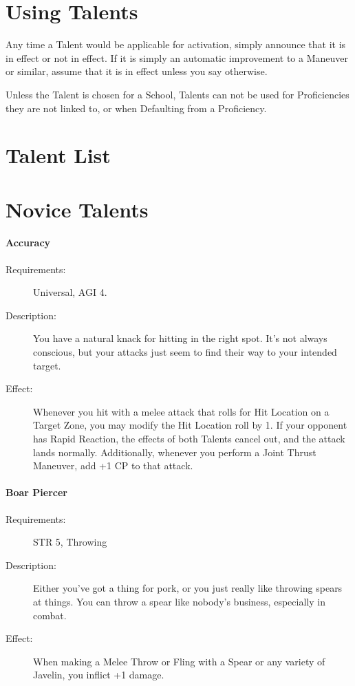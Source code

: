 \documentclass[oneside,11pt,english]{book}
\begin{document}
\section{Using Talents}
Any time a Talent would be applicable for activation, simply announce that it is in effect or not in effect.
If it is simply an automatic improvement to a Maneuver or similar, assume that it is in effect unless you say otherwise. 

Unless the Talent is chosen for a School, Talents can not be used for Proficiencies they are not linked to, or when Defaulting from a Proficiency. 

\section*{Talent List}
\section{Novice Talents}\label{sec:Novice Talents}
\paragraph{\label{talent:Accuracy}Accuracy}
\begin{description}
	\item [Requirements:] Universal, AGI 4. 
	\item [Description:] You have a natural knack for hitting in the right spot. It's not always conscious, but your 
	attacks just seem to find their way to your intended target. 
	\item [Effect:] Whenever you hit with a melee attack that rolls for Hit Location on a Target Zone, you may modify the Hit Location roll by 1. If your opponent has Rapid Reaction, the effects of both Talents cancel 
	out, and the attack lands normally. 
	Additionally, whenever you perform a Joint Thrust Maneuver, add +1 CP to that attack. 
\end{description}
\paragraph{\label{talent:Boar Piercer}Boar Piercer}
\begin{description}
	\item [Requirements:] STR 5, Throwing 
	\item [Description:] Either you’ve got a thing for pork, or you just really like throwing spears at things. You can 
	throw a spear like nobody’s business, especially in combat. 
	\item [Effect:] When making a Melee Throw or Fling with a Spear or any variety of Javelin, you inflict +1 
	damage. 
\end{description}
\end{document}
